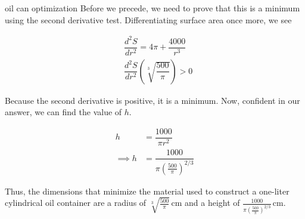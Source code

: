 \begin{examplebreak}{oil can optimization}
    Before we precede, we need to prove that this is a minimum using the second derivative test. Differentiating surface area once more, we see
    
    \begin{align}
        &\dfrac{d^2S}{dr^2} = 4 \pi + \dfrac{4000}{r^3} \\
        &\dfrac{d^2S}{dr^2} \left( \sqrt[3]{\dfrac{500}{\pi}} \right) > 0
    \end{align}
    
    Because the second derivative is positive, it is a minimum. Now, confident in our answer, we can find the value of \( h \).
    
    \begin{align}
        h &= \dfrac{1000}{\pi r^2} \\
        \implies h &= \dfrac{1000}{\pi \left( \frac{500}{\pi} \right)^{2/3}}
    \end{align}
    
    Thus, the dimensions that minimize the material used to construct a one-liter cylindrical oil container are a radius of \( \sqrt[3]{\frac{500}{\pi}} \, \si{\cm} \) and a height of \( \frac{1000}{\pi \left( \frac{500}{\pi} \right)^{2/3}} \, \si{\cm} \).
\end{examplebreak}

